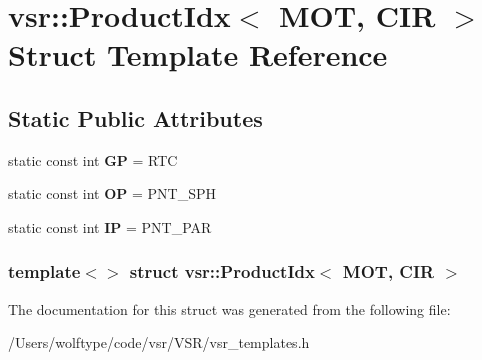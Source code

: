 \hypertarget{structvsr_1_1_product_idx_3_01_m_o_t_00_01_c_i_r_01_4}{\section{vsr\-:\-:Product\-Idx$<$ M\-O\-T, C\-I\-R $>$ Struct Template Reference}
\label{structvsr_1_1_product_idx_3_01_m_o_t_00_01_c_i_r_01_4}
}
\subsection*{Static Public Attributes}
\begin{DoxyCompactItemize}
\item 
\hypertarget{structvsr_1_1_product_idx_3_01_m_o_t_00_01_c_i_r_01_4_a218630748be6c58394d13c68d8b1af5a}{static const int {\bfseries G\-P} = R\-T\-C}\label{structvsr_1_1_product_idx_3_01_m_o_t_00_01_c_i_r_01_4_a218630748be6c58394d13c68d8b1af5a}

\item 
\hypertarget{structvsr_1_1_product_idx_3_01_m_o_t_00_01_c_i_r_01_4_a342f6a081b83feb9f437266f83a17ce1}{static const int {\bfseries O\-P} = P\-N\-T\-\_\-\-S\-P\-H}\label{structvsr_1_1_product_idx_3_01_m_o_t_00_01_c_i_r_01_4_a342f6a081b83feb9f437266f83a17ce1}

\item 
\hypertarget{structvsr_1_1_product_idx_3_01_m_o_t_00_01_c_i_r_01_4_ad3f9b0109faddee16f0d3ff2ca622919}{static const int {\bfseries I\-P} = P\-N\-T\-\_\-\-P\-A\-R}\label{structvsr_1_1_product_idx_3_01_m_o_t_00_01_c_i_r_01_4_ad3f9b0109faddee16f0d3ff2ca622919}

\end{DoxyCompactItemize}
\subsubsection*{template$<$$>$ struct vsr\-::\-Product\-Idx$<$ M\-O\-T, C\-I\-R $>$}



The documentation for this struct was generated from the following file\-:\begin{DoxyCompactItemize}
\item 
/\-Users/wolftype/code/vsr/\-V\-S\-R/vsr\-\_\-templates.\-h\end{DoxyCompactItemize}
